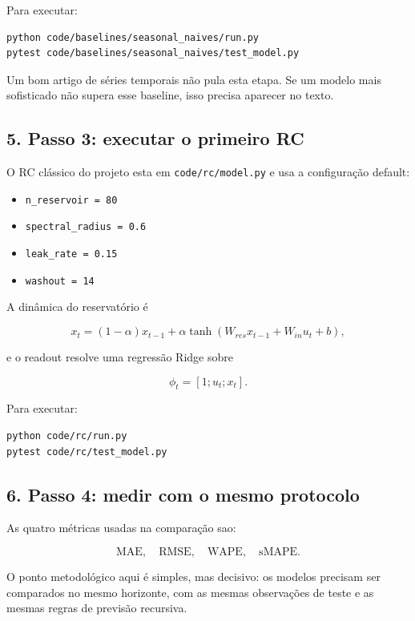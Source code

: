 \documentclass[12pt]{article}
\providecommand{\tightlist}{%
          \setlength{\itemsep}{0pt}\setlength{\parskip}{0pt}}
\begin{document}
Para executar:

\begin{verbatim}
python code/baselines/seasonal_naives/run.py
pytest code/baselines/seasonal_naives/test_model.py
\end{verbatim}

Um bom artigo de séries temporais não pula esta etapa. Se um modelo mais sofisticado não supera esse baseline, isso precisa aparecer no texto.

\subsection{5. Passo 3: executar o primeiro RC}\label{5-passo-3-executar-o-primeiro-rc}

O RC clássico do projeto esta em \texttt{code/rc/model.py} e usa a configuração default:

\begin{itemize}
\tightlist
\item
  \texttt{n\_reservoir\ =\ 80}
\item
  \texttt{spectral\_radius\ =\ 0.6}
\item
  \texttt{leak\_rate\ =\ 0.15}
\item
  \texttt{washout\ =\ 14}
\end{itemize}

A dinâmica do reservatório é

\[
x_t = (1 - \alpha) x_{t-1} + \alpha \tanh(W_{res} x_{t-1} + W_{in} u_t + b),
\]

e o readout resolve uma regressão Ridge sobre

\[
\phi_t = [1; u_t; x_t].
\]

Para executar:

\begin{verbatim}
python code/rc/run.py
pytest code/rc/test_model.py
\end{verbatim}

\subsection{6. Passo 4: medir com o mesmo protocolo}\label{6-passo-4-medir-com-o-mesmo-protocolo}

As quatro métricas usadas na comparação sao:

\[
\mathrm{MAE},\quad \mathrm{RMSE},\quad \mathrm{WAPE},\quad \mathrm{sMAPE}.
\]

O ponto metodológico aqui é simples, mas decisivo: os modelos precisam ser comparados no mesmo horizonte, com as mesmas observações de teste e as mesmas regras de previsão recursiva.
\end{document}
